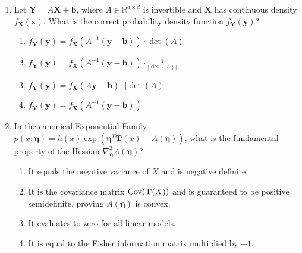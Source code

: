 \begin{enumerate}[label=\textbf{MCQ\arabic*.}]
    \item Let $\mathbf{Y} = A\mathbf{X} + \mathbf{b}$, where $A \in \mathbb{R}^{d \times d}$ is invertible and $\mathbf{X}$ has continuous density $f_{\mathbf{X}}(\mathbf{x})$. What is the correct probability density function $f_{\mathbf{Y}}(\mathbf{y})$?
    \begin{enumerate}[label=(\alph*)]
        \item $f_{\mathbf{Y}}(\mathbf{y}) = f_{\mathbf{X}}(A^{-1}(\mathbf{y} - \mathbf{b})) \cdot \det(A)$
        \item $f_{\mathbf{Y}}(\mathbf{y}) = f_{\mathbf{X}}(A^{-1}(\mathbf{y} - \mathbf{b})) \cdot \frac{1}{|\det(A)|}$
        \item $f_{\mathbf{Y}}(\mathbf{y}) = f_{\mathbf{X}}(A\mathbf{y} + \mathbf{b}) \cdot |\det(A)|$
        \item $f_{\mathbf{Y}}(\mathbf{y}) = f_{\mathbf{X}}(A^{-1}(\mathbf{y} - \mathbf{b}))$
    \end{enumerate}

    \item In the canonical Exponential Family $p(x; \boldsymbol{\eta}) = h(x)\exp(\boldsymbol{\eta}^T \mathbf{T}(x) - A(\boldsymbol{\eta}))$, what is the fundamental property of the Hessian $\nabla_{\boldsymbol{\eta}}^2 A(\boldsymbol{\eta})$?
    \begin{enumerate}[label=(\alph*)]
        \item It equals the negative variance of $X$ and is negative definite.
        \item It is the covariance matrix $\operatorname{Cov}(\mathbf{T}(X))$ and is guaranteed to be positive semidefinite, proving $A(\boldsymbol{\eta})$ is convex.
        \item It evaluates to zero for all linear models.
        \item It is equal to the Fisher information matrix multiplied by $-1$.
    \end{enumerate}
\end{enumerate}
